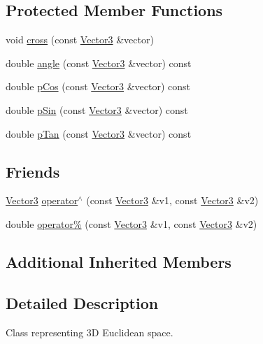 \subsection*{Protected Member Functions}
\begin{DoxyCompactItemize}
\item 
void \mbox{\hyperlink{class_vector3_a2197fa650334cfd893c96e0e709de1ef}{cross}} (const \mbox{\hyperlink{class_vector3}{Vector3}} \&vector)
\item 
double \mbox{\hyperlink{class_vector3_a4ec864436ebac499950f4c06091688db}{angle}} (const \mbox{\hyperlink{class_vector3}{Vector3}} \&vector) const
\item 
double \mbox{\hyperlink{class_vector3_a98422ceb8200829cea11bdeb6417daba}{p\+Cos}} (const \mbox{\hyperlink{class_vector3}{Vector3}} \&vector) const
\item 
double \mbox{\hyperlink{class_vector3_a38053a75ccb2f7415fff046609c52e31}{p\+Sin}} (const \mbox{\hyperlink{class_vector3}{Vector3}} \&vector) const
\item 
double \mbox{\hyperlink{class_vector3_aef71e3e404dd8183e3bd5ed901e91444}{p\+Tan}} (const \mbox{\hyperlink{class_vector3}{Vector3}} \&vector) const
\end{DoxyCompactItemize}
\subsection*{Friends}
\begin{DoxyCompactItemize}
\item 
\mbox{\hyperlink{class_vector3}{Vector3}} \mbox{\hyperlink{class_vector3_a5500ab32f732fd9b9ed9a530b1a2ff06}{operator$^\wedge$}} (const \mbox{\hyperlink{class_vector3}{Vector3}} \&v1, const \mbox{\hyperlink{class_vector3}{Vector3}} \&v2)
\item 
double \mbox{\hyperlink{class_vector3_a3ec8a9ae24e8b79b7d6c360af8d9ad38}{operator\%}} (const \mbox{\hyperlink{class_vector3}{Vector3}} \&v1, const \mbox{\hyperlink{class_vector3}{Vector3}} \&v2)
\end{DoxyCompactItemize}
\subsection*{Additional Inherited Members}


\subsection{Detailed Description}
Class representing 3D Euclidean space. 

